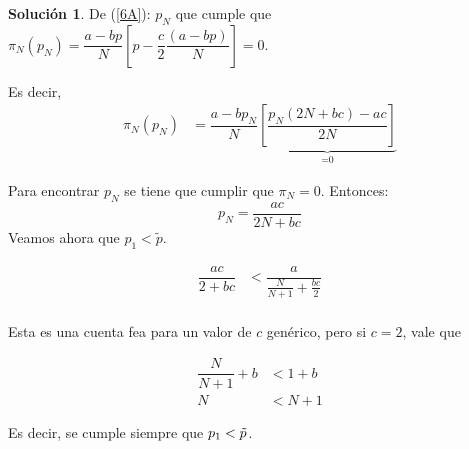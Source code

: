\documentclass[a4paper, 11pt]{article}
\theoremstyle{definition}
\newtheorem{solucion}{Soluci\'on}
\newcommand{\cor}[1]{\left[#1\right]}
\begin{document}
\begin{solucion}
De (\ref{6A}): $p_N$ que cumple que $\pi_N(p_N)=\dfrac{a-bp}{N}\cor{p-\dfrac{c}{2}\dfrac{(a-bp)}{N}}=0$. 

Es decir,
\vspace*{-8pt}
\begin{align*}
\pi_N(p_N)&=\dfrac{a-bp_N}{N}\underbrace{\left[\dfrac{p_N(2N+bc)-ac}{2N}\right]}_\text{=0}
\end{align*}

Para encontrar $p_N$ se tiene que cumplir que $\pi_N=0$. Entonces:
\vspace*{-8pt}
\[ p_N=\dfrac{ac}{2N+bc}\]
\vspace*{-8pt}
Veamos ahora que $p_1<\widetilde{p}$.

\vspace*{-16pt}
\begin{align*}
\dfrac{ac}{2+bc}&<\dfrac{a}{\frac{N}{N+1}+\frac{bc}{2}}\\
\end{align*}
\vspace*{-30pt}

Esta es una cuenta fea para un valor de $c$ genérico, pero si $c=2$, vale que

\begin{align*}
    \dfrac{N}{N+1}+b&<1+b\\
    N&<N+1
\end{align*}

\noindent Es decir, se cumple siempre que $p_1<\Tilde{p}$.





\end{solucion}
\end{document}
